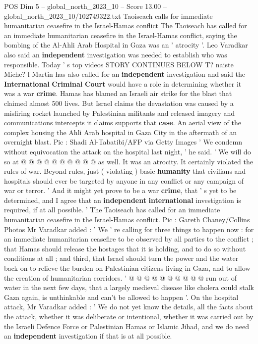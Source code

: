 \begin{textsample}{POS Dim 5 – global\_north\_2023\_10 – Score 13.00 – global\_north\_2023\_10/102749322.txt}  \label{ex:f5_pos_424}
Taoiseach calls for immediate humanitarian ceasefire in the Israel-Hamas conflict The Taoiseach has called for an immediate humanitarian ceasefire in the Israel-Hamas conflict, saying the bombing of the Al-Ahli Arab Hospital in Gaza was an ' atrocity '.
Leo Varadkar also said an \textbf{independent} investigation was needed to establish who was responsible.
Today ' s top videos STORY CONTINUES BELOW T? naiste Miche? l Martin has also called for an \textbf{independent} investigation and said the \textbf{International} \textbf{Criminal} \textbf{Court} would have a role in determining whether it was a war \textbf{crime}.
Hamas has blamed an Israeli air strike for the blast that claimed almost 500 lives.
But Israel claims the devastation was caused by a misfiring rocket launched by Palestinian militants and released imagery and communications intercepts it claims supports that \textbf{case}.
An aerial view of the complex housing the Ahli Arab hospital in Gaza City in the aftermath of an overnight blast.
Pic : Shadi Al-Tabatibi/AFP via Getty Images ' We condemn without equivocation the attack on the hospital last night, ' he said. ' We will do so at @ @ @ @ @ @ @ @ @ @ as well.
It was an atrocity.
It certainly violated the rules of war.
Beyond rules, just ( violating ) basic \textbf{humanity} that civilians and hospitals should ever be targeted by anyone in any conflict or any campaign of war or terror. ' And it might yet prove to be a war \textbf{crime}, that ' s yet to be determined, and I agree that an \textbf{independent} \textbf{international} investigation is required, if at all possible. ' The Taoiseach has called for an immediate humanitarian ceasefire in the Israel-Hamas conflict.
Pic : Gareth Chaney/Collins Photos Mr Varadkar added : ' We ' re calling for three things to happen now : for an immediate humanitarian ceasefire to be observed by all parties to the conflict ; that Hamas should release the hostages that it is holding, and to do so without conditions at all ; and third, that Israel should turn the power and the water back on to relieve the burden on Palestinian citizens living in Gaza, and to allow the creation of humanitarian corridors. ' @ @ @ @ @ @ @ @ @ @ run out of water in the next few days, that a largely medieval disease like cholera could stalk Gaza again, is unthinkable and can't be allowed to happen '.
On the hospital attack, Mr Varadkar added : ' We do not yet know the details, all the facts about the attack, whether it was deliberate or intentional, whether it was carried out by the Israeli Defence Force or Palestinian Hamas or Islamic Jihad, and we do need an \textbf{independent} investigation if that is at all possible.

\end{textsample}
